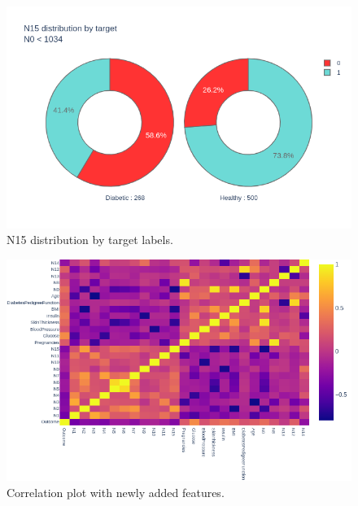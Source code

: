 \documentclass[12pt]{article}
\begin{document}
\begin{figure}[ht]
\centering
\includegraphics[width=1\textwidth]{newplot(41).png}
\caption{N15 distribution by target labels.}
\end{figure}

\begin{figure}[ht]
\centering
\includegraphics[width=1\textwidth]{newplot(42).png}
\caption{Correlation plot with newly added features.}
\end{figure}
\end{document}

